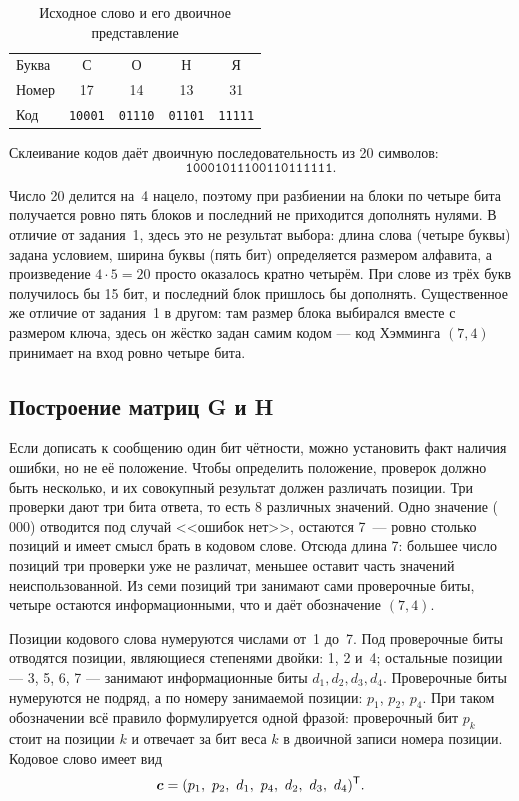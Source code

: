 \documentclass[a4paper,14pt]{extarticle}
\begin{document}
\begin{table}[H]
\caption{Исходное слово и его двоичное представление}
\label{tab:message3}
\centering\footnotesize\setlength{\tabcolsep}{8pt}
\begin{tabular}{l|cccc}
\toprule
Буква & С & О & Н & Я \\
Номер & 17 & 14 & 13 & 31 \\
Код & \texttt{10001} & \texttt{01110} & \texttt{01101} & \texttt{11111} \\
\bottomrule
\end{tabular}
\end{table}

Склеивание кодов даёт двоичную последовательность из 20 символов:
\begin{equation}
  \texttt{10001011100110111111}.
  \label{eq:msg20}
\end{equation}

Число 20 делится на~4 нацело, поэтому при разбиении на блоки по четыре бита получается
ровно пять блоков и последний не приходится дополнять нулями. В отличие от задания~1,
здесь это не результат выбора: длина слова (четыре буквы) задана условием, ширина
буквы (пять бит) определяется размером алфавита, а произведение $4 \cdot 5 = 20$
просто оказалось кратно четырём. При слове из трёх букв получилось бы 15 бит, и
последний блок пришлось бы дополнять. Существенное же отличие от задания~1 в другом:
там размер блока выбирался вместе с размером ключа, здесь он жёстко задан самим
кодом --- код Хэмминга $(7,4)$ принимает на вход ровно четыре бита.

\subsection{Построение матриц G и H}

Если дописать к сообщению один бит чётности, можно установить факт наличия ошибки,
но не её положение. Чтобы определить положение, проверок должно быть несколько, и их
совокупный результат должен различать позиции. Три проверки дают три бита ответа,
то есть 8 различных значений. Одно значение ($000$) отводится под случай <<ошибок
нет>>, остаются 7~--- ровно столько позиций и имеет смысл брать в кодовом слове.
Отсюда длина 7: большее число позиций три проверки уже не различат, меньшее оставит
часть значений неиспользованной. Из семи позиций три занимают сами проверочные биты,
четыре остаются информационными, что и даёт обозначение $(7,4)$.

Позиции кодового слова нумеруются числами от~1 до~7. Под проверочные биты отводятся
позиции, являющиеся степенями двойки: 1, 2 и~4; остальные позиции --- 3, 5, 6, 7 ---
занимают информационные биты $d_1, d_2, d_3, d_4$. Проверочные биты нумеруются не
подряд, а по номеру занимаемой позиции: $p_1$, $p_2$, $p_4$. При таком обозначении
всё правило формулируется одной фразой: проверочный бит $p_k$ стоит на позиции $k$ и
отвечает за бит веса $k$ в двоичной записи номера позиции. Кодовое слово имеет вид
\begin{equation}
  \vect{c} = (p_1,\ p_2,\ d_1,\ p_4,\ d_2,\ d_3,\ d_4)^{\mathsf{T}} .
  \label{eq:cword}
\end{equation}
\end{document}

